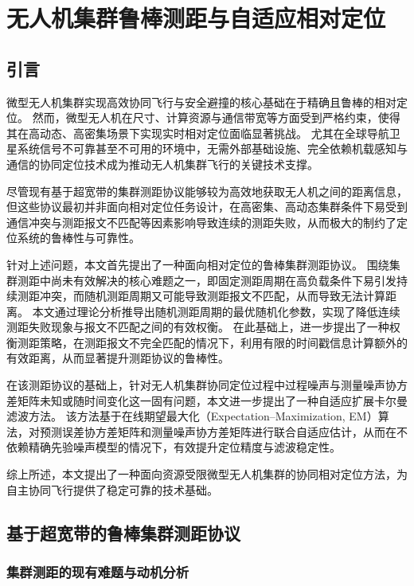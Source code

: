 \newtheorem{theorem}{定理}
\newtheorem{definition}{定义}
\newtheorem{lemma}{Lemma}
\chapter{无人机集群鲁棒测距与自适应相对定位}
\section{引言}


微型无人机集群实现高效协同飞行与安全避撞的核心基础在于精确且鲁棒的相对定位。
然而，微型无人机在尺寸、计算资源与通信带宽等方面受到严格约束，使得其在高动态、高密集场景下实现实时相对定位面临显著挑战。
尤其在全球导航卫星系统信号不可靠甚至不可用的环境中，无需外部基础设施、完全依赖机载感知与通信的协同定位技术成为推动无人机集群飞行的关键技术支撑。

尽管现有基于超宽带的集群测距协议能够较为高效地获取无人机之间的距离信息，但这些协议最初并非面向相对定位任务设计，在高密集、高动态集群条件下易受到通信冲突与测距报文不匹配等因素影响导致连续的测距失败，从而极大的制约了定位系统的鲁棒性与可靠性。

针对上述问题，本文首先提出了一种面向相对定位的鲁棒集群测距协议。
围绕集群测距中尚未有效解决的核心难题之一，即固定测距周期在高负载条件下易引发持续测距冲突，而随机测距周期又可能导致测距报文不匹配，从而导致无法计算距离。
本文通过理论分析推导出随机测距周期的最优随机化参数，实现了降低连续测距失败现象与报文不匹配之间的有效权衡。
在此基础上，进一步提出了一种权衡测距策略，在测距报文不完全匹配的情况下，利用有限的时间戳信息计算额外的有效距离，从而显著提升测距协议的鲁棒性。

在该测距协议的基础上，针对无人机集群协同定位过程中过程噪声与测量噪声协方差矩阵未知或随时间变化这一固有问题，本文进一步提出了一种自适应扩展卡尔曼滤波方法。
该方法基于在线期望最大化（Expectation–Maximization, EM）算法，对预测误差协方差矩阵和测量噪声协方差矩阵进行联合自适应估计，从而在不依赖精确先验噪声模型的情况下，有效提升定位精度与滤波稳定性。

综上所述，本文提出了一种面向资源受限微型无人机集群的协同相对定位方法，为自主协同飞行提供了稳定可靠的技术基础。


\section{基于超宽带的鲁棒集群测距协议}
\label{sec:Theory}
\subsection{集群测距的现有难题与动机分析}

